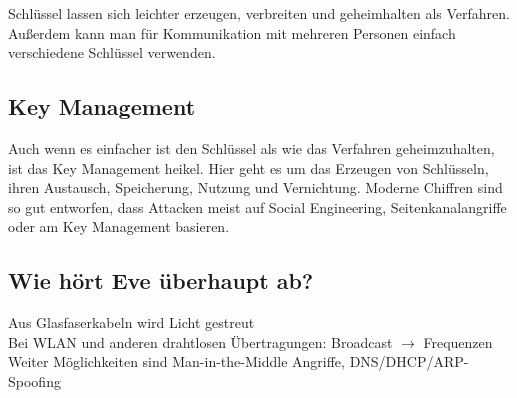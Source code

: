 Schlüssel lassen sich leichter erzeugen, verbreiten und geheimhalten als Verfahren. Außerdem kann man für Kommunikation mit mehreren Personen einfach verschiedene Schlüssel verwenden.

\subsection*{Key Management}
Auch wenn es einfacher ist den Schlüssel als wie das Verfahren geheimzuhalten, ist das Key Management heikel. Hier geht es um das Erzeugen von Schlüsseln, ihren Austausch, Speicherung, Nutzung und Vernichtung. Moderne Chiffren sind so gut entworfen, dass Attacken meist auf Social Engineering, Seitenkanalangriffe oder am Key Management basieren.

\subsection*{Wie hört Eve überhaupt ab?}
Aus Glasfaserkabeln wird Licht gestreut \\
Bei WLAN und anderen drahtlosen Übertragungen: Broadcast $\rightarrow$ Frequenzen \\
Weiter Möglichkeiten sind Man-in-the-Middle Angriffe, DNS/DHCP/ARP-Spoofing

